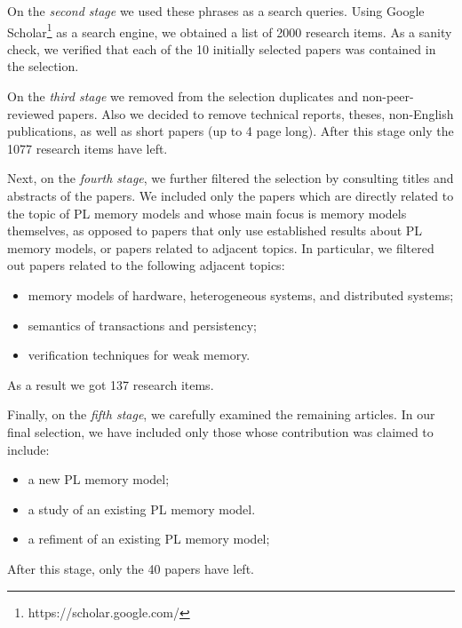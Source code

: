 On the \emph{second stage} we used these phrases as a search queries. 
Using Google Scholar\footnote{https://scholar.google.com/} as a search engine, 
we obtained a list of 2000 research items. 
As a sanity check, we verified that each of the 10 initially selected papers 
was contained in the selection. 

On the \emph{third stage} we removed from the selection duplicates and non-peer-reviewed papers. 
Also we decided to remove technical reports, theses, 
non-English publications, as well as short papers (up to 4 page long).
After this stage only the 1077 research items have left.

Next, on the \emph{fourth stage}, we further filtered the selection 
by consulting titles and abstracts of the papers. 
We included only the papers which are directly related to the 
topic of PL memory models and whose main focus is memory models themselves,
as opposed to papers that only use established results about PL memory models,
or papers related to adjacent topics. 
In particular, we filtered out papers related to the following adjacent topics:
\begin{itemize}
  \item memory models of hardware, heterogeneous systems, and distributed systems;
  \item semantics of transactions and persistency;
  \item verification techniques for weak memory.
\end{itemize}
As a result we got 137 research items.

Finally, on the \emph{fifth stage}, we carefully examined the remaining articles.
In our final selection, we have included only those whose contribution was claimed to include:
\begin{itemize}
  \item a new PL memory model;
  \item a study of an existing PL memory model.
  \item a refiment of an existing PL memory model;
\end{itemize}
After this stage, only the 40 papers have left.

